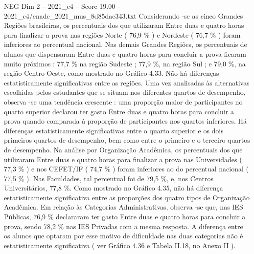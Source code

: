 \begin{textsample}{NEG Dim 2 – 2021\_c4 – Score 19.00 – 2021\_c4/enade\_2021\_mus\_8d85dac343.txt}
Considerando -se as cinco Grandes Regiões brasileiras, os percentuais dos que utilizaram Entre duas e quatro horas para finalizar a prova nas regiões Norte ( 76,9 \% ) e Nordeste ( 76,7 \% ) foram inferiores ao percentual nacional.
Nas demais Grandes Regiões, os percentuais de alunos que dispensaram Entre duas e quatro horas para concluir a prova ficaram muito próximos : 77,7 \% na região Sudeste ; 77,9 \%, na região Sul ; e 79,0 \%, na região Centro-Oeste, como mostrado no Gráfico 4.33.
Não há diferenças estatisticamente significativas entre as regiões.
Uma vez analisadas às alternativas escolhidas pelos estudantes que se situam nos diferentes quartos de desempenho, observa -se uma tendência crescente : uma proporção maior de participantes no quarto superior declarou ter gasto Entre duas e quatro horas para concluir a prova quando comparada à proporção de participantes nos quartos inferiores.
Há diferenças estatisticamente significativas entre o quarto superior e os dois primeiros quartos de desempenho, bem como entre o primeiro e o terceiro quartos de desempenho.
Na análise por Organização Acadêmica, os percentuais dos que utilizaram Entre duas e quatro horas para finalizar a prova nas Universidades ( 77,3 \% ) e nos CEFET/IF ( 74,7 \% ) foram inferiores ao do percentual nacional ( 77,5 \% ).
Nas Faculdades, tal percentual foi de 79,5 \%, e, nos Centros Universitários, 77,8 \%.
Como mostrado no Gráfico 4.35, não há diferença estatisticamente significativa entre as proporções dos quatro tipos de Organização Acadêmica.
Em relação às Categorias Administrativas, observa -se que, nas IES Públicas, 76,9 \% declararam ter gasto Entre duas e quatro horas para concluir a prova, sendo 78,2 \% nas IES Privadas com a mesma resposta.
A diferença entre os alunos que optaram por esse motivo de dificuldade nas duas categorias não é estatisticamente significativa ( ver Gráfico 4.36 e Tabela II.18, no Anexo II ).

\end{textsample}
